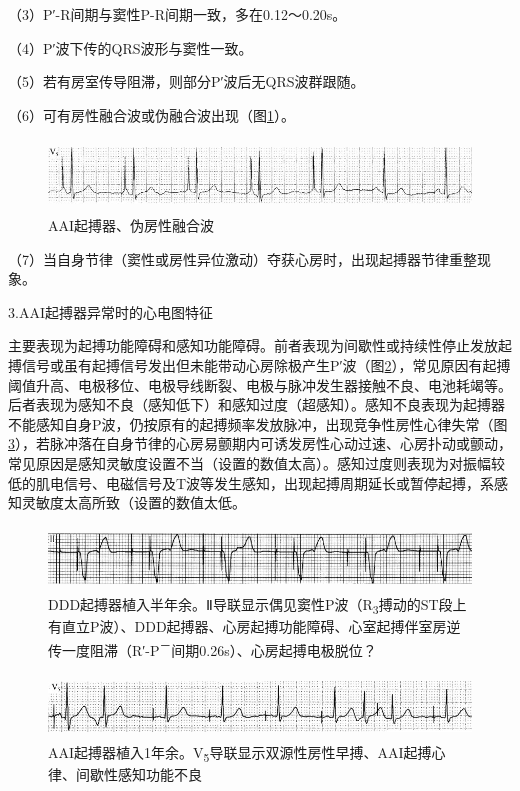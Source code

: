 （3）P′-R间期与窦性P-R间期一致，多在0.12～0.20s。

（4）P′波下传的QRS波形与窦性一致。

（5）若有房室传导阻滞，则部分P′波后无QRS波群跟随。

（6）可有房性融合波或伪融合波出现（图\ref{fig38-14}）。

\begin{figure}[!htbp]
 \centering
 \includegraphics[width=5.58333in,height=0.75in]{./images/Image00617.jpg}
 \captionsetup{justification=centering}
 \caption{AAI起搏器、伪房性融合波}
 \label{fig38-14}
  \end{figure} 

（7）当自身节律（窦性或房性异位激动）夺获心房时，出现起搏器节律重整现象。

3.AAI起搏器异常时的心电图特征

主要表现为起搏功能障碍和感知功能障碍。前者表现为间歇性或持续性停止发放起搏信号或虽有起搏信号发出但未能带动心房除极产生P′波（图\ref{fig38-15}），常见原因有起搏阈值升高、电极移位、电极导线断裂、电极与脉冲发生器接触不良、电池耗竭等。后者表现为感知不良（感知低下）和感知过度（超感知）。感知不良表现为起搏器不能感知自身P波，仍按原有的起搏频率发放脉冲，出现竞争性房性心律失常（图\ref{fig38-16}），若脉冲落在自身节律的心房易颤期内可诱发房性心动过速、心房扑动或颤动，常见原因是感知灵敏度设置不当（设置的数值太高）。感知过度则表现为对振幅较低的肌电信号、电磁信号及T波等发生感知，出现起搏周期延长或暂停起搏，系感知灵敏度太高所致（设置的数值太低。

\begin{figure}[!htbp]
 \centering
 \includegraphics[width=5.58333in,height=0.66667in]{./images/Image00618.jpg}
 \captionsetup{justification=centering}
 \caption{DDD起搏器植入半年余。Ⅱ导联显示偶见窦性P波（R\textsubscript{3}搏动的ST段上有直立P波）、DDD起搏器、心房起搏功能障碍、心室起搏伴室房逆传一度阻滞（R′-P\textsuperscript{－}间期0.26s）、心房起搏电极脱位？}
 \label{fig38-15}
  \end{figure} 


\begin{figure}[!htbp]
 \centering
 \includegraphics[width=5.58333in,height=0.66667in]{./images/Image00619.jpg}
 \captionsetup{justification=centering}
 \caption{AAI起搏器植入1年余。V\textsubscript{5}导联显示双源性房性早搏、AAI起搏心律、间歇性感知功能不良}
 \label{fig38-16}
  \end{figure} 


